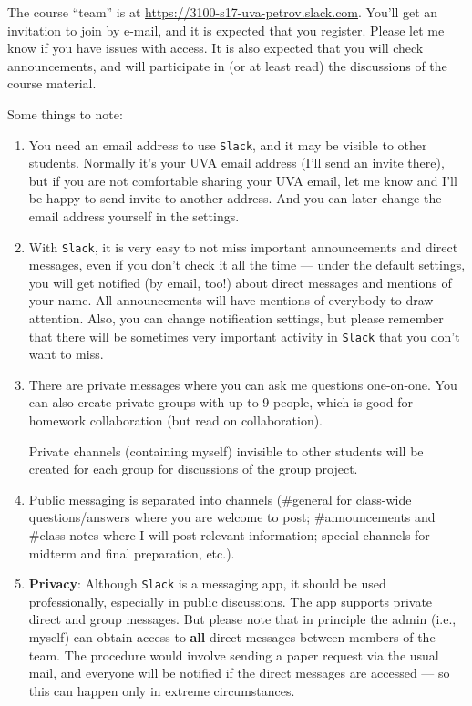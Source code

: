\documentclass[oneside,11pt]{amsart}
\begin{document}
The course ``team'' is at \url{https://3100-s17-uva-petrov.slack.com}. You'll get
an invitation to join by e-mail, and it is expected that you register.
Please
let me know if you have issues with access. 
It is also expected that you
will check announcements, and will participate in (or at least read)
the discussions of the course material.

Some things to note: 
\begin{enumerate}[$\bullet$] 
	\item You need an email address to use
		\texttt{Slack}, and it may be visible to other students. 
		Normally it's your UVA email address (I'll send an invite
		there), but if you are not comfortable sharing your UVA email, let me know
		and I'll be happy to send invite to another address.
		And you can later change the email address yourself in the
		settings.

	\item With \texttt{Slack}, it is very easy to not miss important announcements and direct messages, even if 
		you don't check it all the time --- under the default settings, you will get notified (by email, too!)
		about direct messages and mentions of your name. All announcements will have mentions of everybody
		to draw attention. Also, you can change notification settings, but please remember that
		there will be sometimes very important activity in \texttt{Slack} that you don't want to miss.

	\item There are private messages where you can ask me questions
		one-on-one. You can also create private groups with up to 9 people, which
		is good for homework collaboration (but read  on
		collaboration).

		\noindent Private channels (containing myself) invisible to other students
		will be created for each group for discussions of the group project.

	\item Public messaging is separated into channels
		(\#general for class-wide questions/answers where you are welcome to post; 
			\#announcements and \#class-notes where I will post relevant information;
			special channels for midterm and final preparation, etc.).  
	\item \textbf{Privacy}:
		Although \texttt{Slack} is a messaging app, it should be used
		professionally, especially in public discussions. The app supports private
		direct and group messages. But please note that in principle the admin
		(i.e., myself) can obtain access to \textbf{all} direct messages between
		members of the team. The procedure would involve sending a paper request
		via the usual mail, and everyone will be notified if the direct messages
		are accessed --- so this can happen only in extreme circumstances.
\end{enumerate}
\end{document}
